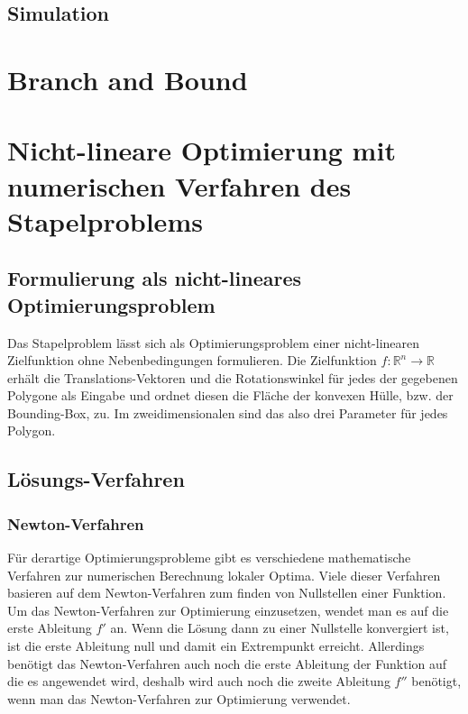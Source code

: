 \documentclass[runningheads,a4paper]{llncs}
\begin{document}
\subsection{Simulation}

\section{Branch and Bound}

\section{Nicht-lineare Optimierung mit numerischen Verfahren des Stapelproblems}

\subsection{Formulierung als nicht-lineares Optimierungsproblem}
\label{formObjStacking}
Das Stapelproblem lässt sich als Optimierungsproblem einer nicht-linearen Zielfunktion ohne Nebenbedingungen formulieren. Die Zielfunktion ${f: \mathbb{R}^n \rightarrow \mathbb{R}}$ erhält die Translations-Vektoren und die Rotationswinkel für jedes der gegebenen Polygone als Eingabe und ordnet diesen die Fläche der konvexen Hülle, bzw. der Bounding-Box, zu. Im zweidimensionalen sind das also drei Parameter für jedes Polygon.

\subsection{Lösungs-Verfahren}
\label{sec:uncon_nonlin_opt}

\subsubsection{Newton-Verfahren}

Für derartige Optimierungsprobleme gibt es verschiedene mathematische Verfahren zur numerischen Berechnung lokaler Optima. Viele dieser Verfahren basieren auf dem Newton-Verfahren zum finden von Nullstellen einer Funktion. Um das Newton-Verfahren zur Optimierung einzusetzen, wendet man es auf die erste Ableitung $f'$ an. Wenn die Lösung dann zu einer Nullstelle konvergiert ist, ist die erste Ableitung null und damit ein Extrempunkt erreicht. Allerdings benötigt das Newton-Verfahren auch noch die erste Ableitung der Funktion auf die es angewendet wird, deshalb wird auch noch die zweite Ableitung $f''$ benötigt, wenn man das Newton-Verfahren zur Optimierung verwendet.
\end{document}

